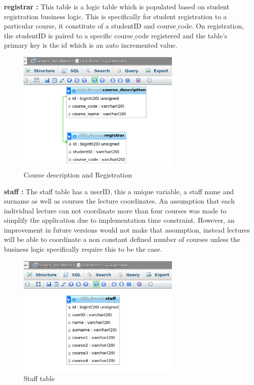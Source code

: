 \begin{itemize}
\textbf{registrar : }
This table is a logic table which is populated based on student registration business logic. This is specifically for student registration to a particular course, it constitute of a studentID and course$\_$code. On registration, the studentID is paired to a specific course$\_$code registered and the table's primary key is the id which is an auto incremented value.

\begin{center}
\begin{figure}[h]
\centering
\includegraphics[width=8cm]{descriptionAndRegistar}
\caption{Course description and Registration}
\end{figure}
\end{center}

\clearpage
\textbf{staff : }
The staff table has a userID, this a unique variable, a staff name and surname as well as courses the lecture coordinates. An assumption that each individual lecture can not coordinate more than four courses was made to simplify the application due to implementation time constraint. However, an improvement in future versions would not make that assumption, instead lectures will be able to coordinate a non constant defined number of courses unless the business logic specifically require this to be the case.        

\begin{center}
\begin{figure}[h]
\centering
\includegraphics[width=8cm]{Staff}
\caption{Staff table}
\end{figure}
\end{center}


\end{itemize}
